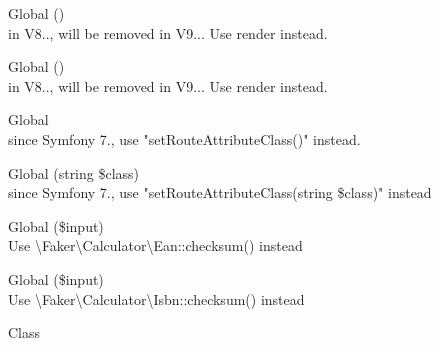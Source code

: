 \begin{DoxyRefList}
\item[Global \doxylink{class_sabberworm_1_1_c_s_s_1_1_c_s_s_list_1_1_at_rule_block_list_a7516ca30af0db3cdbf9a7739b48ce91d}{At\+Rule\+Block\+List\+::\+\_\+\+\_\+to\+String} ()]\hfill \\
\label{deprecated__deprecated000381}%
%
in V8.., will be removed in V9... Use {\ttfamily render} instead.  
\item[Global \doxylink{class_sabberworm_1_1_c_s_s_1_1_rule_set_1_1_at_rule_set_a7516ca30af0db3cdbf9a7739b48ce91d}{At\+Rule\+Set\+::\+\_\+\+\_\+to\+String} ()]\hfill \\
\label{deprecated__deprecated000404}%
%
in V8.., will be removed in V9... Use {\ttfamily render} instead.  
\item[Global \doxylink{class_symfony_1_1_component_1_1_routing_1_1_loader_1_1_attribute_class_loader_af240f23b12f991b485b80cdcba2e18f9}{Attribute\+Class\+Loader\+::\$route\+Annotation\+Class} ]\hfill \\
\label{deprecated__deprecated000437}%
%
since Symfony 7., use "{}set\+Route\+Attribute\+Class()"{} instead.  
\item[Global \doxylink{class_symfony_1_1_component_1_1_routing_1_1_loader_1_1_attribute_class_loader_acd4e51d78002819140d1695c81c4a13b}{Attribute\+Class\+Loader\+::set\+Route\+Annotation\+Class} (string \$class)]\hfill \\
\label{deprecated__deprecated000438}%
%
since Symfony 7., use "{}set\+Route\+Attribute\+Class(string \$class)"{} instead 
\item[Global \doxylink{class_faker_1_1_provider_1_1_barcode_a3935d37cb6733ca975b4f6809efa78bd}{Barcode\+::ean\+Checksum} (\$input)]\hfill \\
\label{deprecated__deprecated000064}%
%
Use \textbackslash{}\+Faker\textbackslash{}\+Calculator\textbackslash{}\+Ean\+::checksum() instead 
\item[Global \doxylink{class_faker_1_1_provider_1_1_barcode_a05730b7ee37602de6fa5825bd91d8867}{Barcode\+::isbn\+Checksum} (\$input)]\hfill \\
\label{deprecated__deprecated000065}%
%
Use \textbackslash{}\+Faker\textbackslash{}\+Calculator\textbackslash{}\+Isbn\+::checksum() instead 
\item[Class \doxylink{class_ramsey_1_1_uuid_1_1_converter_1_1_number_1_1_big_number_converter}{Big\+Number\+Converter} ]\hfill \\

\end{DoxyRefList}
